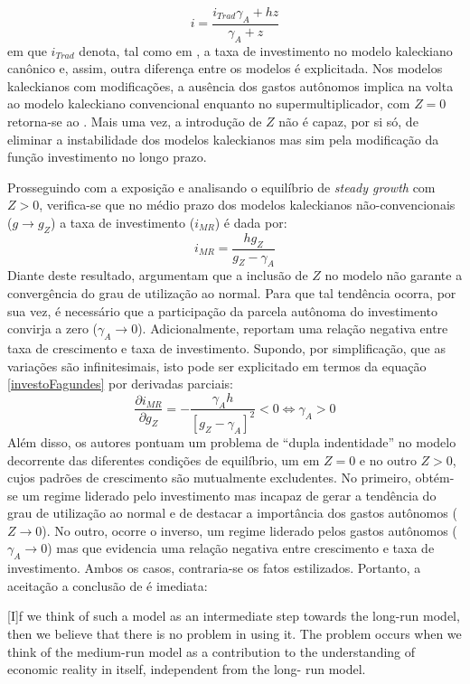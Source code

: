 $$
i = \frac{i_{Trad}\gamma_A + hz}{\gamma_A + z}
$$
em que $i_{Trad}$ denota, tal como em \textcite{fagundes_dinamica_2017}, a taxa de investimento no modelo kaleckiano canônico e, assim, outra diferença entre os modelos é explicitada. Nos modelos kaleckianos com modificações, a ausência dos gastos autônomos implica na volta ao modelo kaleckiano convencional enquanto no supermultiplicador, com $Z = 0$ retorna-se ao \textcite{harrod_essay_1939}. Mais uma vez, a introdução de $Z$ não é capaz, por si só, de eliminar a instabilidade dos modelos kaleckianos mas sim pela modificação da função investimento no longo prazo. 

Prosseguindo com a exposição e analisando o equilíbrio de \textit{steady growth} com $Z > 0$, verifica-se que no médio prazo dos modelos kaleckianos não-convencionais ($g\to g_Z$) a taxa de investimento ($i_{MR}$) é dada por:
\begin{equation}
    \label{investoFagundes}
i_{MR} = \frac{hg_Z}{g_Z - \gamma_A}
\end{equation}
Diante deste resultado, \textcite{fagundes_role_2017} argumentam que a inclusão de $Z$ no modelo não garante a convergência do grau de utilização ao normal. Para que tal tendência ocorra, por sua vez, é necessário que a participação da parcela autônoma do investimento convirja a zero ($\gamma_A \to 0$). 
Adicionalmente, \textcite{fagundes_role_2017} reportam uma relação negativa entre taxa de crescimento e taxa de investimento. Supondo, por simplificação, que as variações são infinitesimais, isto pode ser explicitado em termos da equação \ref{investoFagundes} por derivadas parciais:
$$
\frac{\partial i_{MR}}{\partial g_Z} = - \frac{\gamma_A h}{[g_Z - \gamma_A]^2} < 0 \Leftrightarrow \gamma_A > 0
$$
Além disso, os autores pontuam um problema de ``dupla indentidade'' no modelo decorrente das diferentes condições de equilíbrio, um em $Z = 0$ e no outro $Z>0$, cujos padrões de crescimento são mutualmente excludentes. No primeiro, obtém-se um regime liderado pelo investimento mas incapaz de gerar a tendência do grau de utilização ao normal e de destacar a importância dos gastos autônomos ($Z\to 0$). No outro, ocorre o inverso, um regime liderado pelos gastos autônomos ($\gamma_A \to 0$) mas que evidencia uma relação negativa entre crescimento e taxa de investimento. Ambos os casos, contraria-se os fatos estilizados. Portanto, a aceitação a conclusão de \textcite[p.~13]{fagundes_role_2017} é imediata:

\begin{citacao}

[I]f we think of such a model as an intermediate step towards the long-run model, then we
believe that there is no problem in using it. The problem occurs when we think of the medium-run
model as a contribution to the understanding of economic reality in itself, independent from the long-
run model.
\end{citacao}

